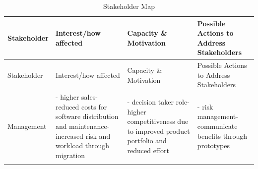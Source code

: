 \hypertarget{tbl:stakeholders}{}
\begin{longtable}[]{@{}llll@{}}
\caption{\label{tbl:stakeholders}Stakeholder Map}\tabularnewline
\toprule
\begin{minipage}[b]{0.16\columnwidth}\raggedright
Stakeholder\strut
\end{minipage} & \begin{minipage}[b]{0.24\columnwidth}\raggedright
Interest/how affected\strut
\end{minipage} & \begin{minipage}[b]{0.24\columnwidth}\raggedright
Capacity \& Motivation\strut
\end{minipage} & \begin{minipage}[b]{0.24\columnwidth}\raggedright
Possible Actions to Address Stakeholders\strut
\end{minipage}\tabularnewline
\midrule
\endfirsthead
\toprule
\begin{minipage}[b]{0.16\columnwidth}\raggedright
Stakeholder\strut
\end{minipage} & \begin{minipage}[b]{0.24\columnwidth}\raggedright
Interest/how affected\strut
\end{minipage} & \begin{minipage}[b]{0.24\columnwidth}\raggedright
Capacity \& Motivation\strut
\end{minipage} & \begin{minipage}[b]{0.24\columnwidth}\raggedright
Possible Actions to Address Stakeholders\strut
\end{minipage}\tabularnewline
\midrule
\endhead
\begin{minipage}[t]{0.16\columnwidth}\raggedright
Management\strut
\end{minipage} & \begin{minipage}[t]{0.24\columnwidth}\raggedright
- higher sales- reduced costs for software distribution and maintenance- increased risk and workload through migration\strut
\end{minipage} & \begin{minipage}[t]{0.24\columnwidth}\raggedright
- decision taker role- higher competitiveness due to improved product portfolio and reduced effort\strut
\end{minipage} & \begin{minipage}[t]{0.24\columnwidth}\raggedright
- risk management- communicate benefits through prototypes\strut
\end{minipage}\tabularnewline
\begin{minipage}[t]{0.16\columnwidth}\raggedright

\end{minipage}
\end{longtable}
